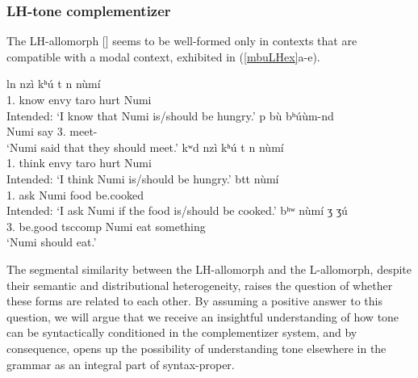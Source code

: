 \documentclass[output=paper,colorlinks,citecolor=brown]{langscibook}
\begin{document}
\subsubsection{LH-tone complementizer} \label{secLH}

The LH-allomorph [\mbuLH] seems to be well-formed only in contexts that are compatible with a modal context, exhibited in (\ref{mbuLHex}a-e).

\ea \label{mbuLHex}
    \begin{xlist}
    \ex \label{mbuLHexa}
         {l\epH n} {\mbuLH} {nzì} {kʰ{ú}} {\epL\epH t} {n\dz\epH} {n{ù}m{í}} \\
             {1.} {know} {} {envy} {taro} {} {hurt} {Numi} \\
        \glt Intended: `I know that Numi is/should be hungry.'
    \ex \label{mbuLHexb}
         {\ds{}p} {\mbuLH} {b{ù}} {bʰ{ú}{ù}m-\ds nd\schwaH} \\
             {Numi} {say} {} {3.} {meet-} \\
        \glt `Numi said that they should meet.'
    \ex \label{mbuLHexc}
         {kʷ\epL d\schwaL} {\mbuLH} {nzì} {kʰ{ú}} {\epL\epH t} {n\dz\epH} {n{ù}m{í}} \\
             {1.} {think} {} {envy} {taro} {} {hurt} {Numi} \\
        \glt Intended: `I think Numi is/should be hungry.'
    \ex \label{mbuLHexd}
         {b\epH tt\schwaH} {n{ù}m{í}} {\mbuLH} {\ch\schwaL{}} {\ds\textscb\schwaH} \\
             {1.} {ask} {Numi} {} {food} {be.cooked} \\
        \glt Intended: `I ask Numi if the food is/should be cooked.'
    \ex \label{mbuLHexe}
         {bʰʷ\ooL} {\mbuLH} {n{ù}m{í}} {{\ds}ʒ\baruH\baruL} {{\ds}ʒ{ú}} \\
             {3.} {be.good} {tsc{comp}} {Numi} {eat} {something} \\
        \glt `Numi should eat.'
    \end{xlist}
\z

The segmental similarity between the LH-allomorph and the L-allomorph, despite their semantic and distributional heterogeneity, raises the question of whether these forms are related to each other. By assuming a positive answer to this question, we will argue that we receive an insightful understanding of how tone can be syntactically conditioned in the complementizer system, and by consequence, opens up the possibility of understanding tone elsewhere in the grammar as an integral part of syntax-proper.
\end{document}
